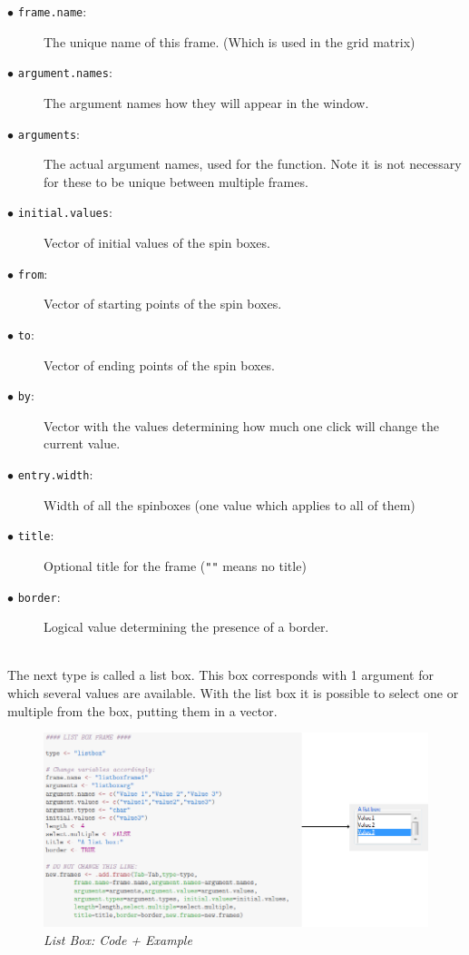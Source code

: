 \documentclass[a4paper]{article}\usepackage[]{graphicx}\usepackage[]{color}
\begin{document}
\begin{description}
  \item[$\bullet$ \texttt{frame.name}:] The unique name of this frame. (Which is used in the grid matrix)
  \item[$\bullet$ \texttt{argument.names}:] The argument names how they will
  appear in the window.  
  \item[$\bullet$ \texttt{arguments}:] The actual argument names, used for the
  function. Note it is not necessary for these to be unique between multiple
  frames.
  \item[$\bullet$ \texttt{initial.values}:] Vector of initial values of the
  spin boxes.
  \item[$\bullet$ \texttt{from}:] Vector of starting points of the spin boxes.
  \item[$\bullet$ \texttt{to}:] Vector of ending points of the spin boxes.
  \item[$\bullet$ \texttt{by}:] Vector with the values determining how much one
  click will change the current value.
  \item[$\bullet$ \texttt{entry.width}:] Width of all the spinboxes (one value
  which applies to all of them)
  \item[$\bullet$ \texttt{title}:] Optional title for the frame (\verb|""| means no title)
  \item[$\bullet$ \texttt{border}:] Logical value determining the presence of a
  border.   
  
\end{description}

\\
\noindent The next type is called a list box. This box corresponds with 1
argument for which several values are available. With the list box it is possible to select
one or multiple from the box, putting them in a vector.
\begin{figure}[H]
\centering
\includegraphics[scale=0.5]{figures/listbox.png}
\caption{{\it List Box: Code + Example}
\label{listbox}}
\end{figure}
\end{document}
